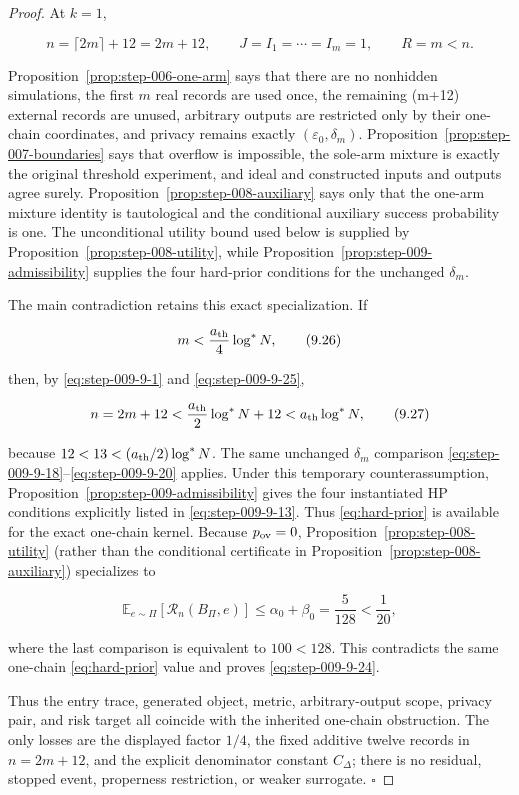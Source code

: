 \begin{proof}
At \(k=1\),

\[
n=\lceil2m\rceil+12=2m+12,
\qquad
J=I_1=\cdots=I_m=1,
\qquad
R=m<n.
\tag{9.25}\label{eq:step-009-9-25}
\]

Proposition~\ref{prop:step-006-one-arm} says that there are no
nonhidden simulations, the first \(m\) real records are used once, the
remaining (m+12) external records are unused, arbitrary outputs are
restricted only by their one-chain coordinates, and privacy remains
exactly \((\varepsilon_0,\delta_m)\).  
Proposition~\ref{prop:step-007-boundaries} says that overflow is
impossible, the sole-arm mixture is exactly the original threshold
experiment, and ideal and constructed inputs and outputs agree surely.
Proposition~\ref{prop:step-008-auxiliary} says only that the
one-arm mixture identity is tautological and the conditional auxiliary
success probability is one.  The unconditional utility bound used below
is supplied by Proposition~\ref{prop:step-008-utility}, while
Proposition~\ref{prop:step-009-admissibility} supplies the four hard-prior
conditions for the unchanged \(\delta_m\).

The main contradiction retains this exact specialization.  If

\[
m<\frac{a_{\rm th}}4\log^*N,
\tag{9.26}\label{eq:step-009-9-26}
\]

then, by \eqref{eq:step-009-9-1} and \eqref{eq:step-009-9-25},

\[
n=2m+12
<\frac{a_{\rm th}}2\log^*N+12
<a_{\rm th}\log^*N,
\tag{9.27}\label{eq:step-009-9-27}
\]

because \(12<13<(a_{\rm th}/2)\log^*N\).  The same unchanged
\(\delta_m\) comparison \eqref{eq:step-009-9-18}--\eqref{eq:step-009-9-20} applies.  Under this temporary
counterassumption, Proposition~\ref{prop:step-009-admissibility} gives
the four instantiated HP conditions explicitly listed in \eqref{eq:step-009-9-13}.  Thus
\eqref{eq:hard-prior} is
available for the exact one-chain kernel.  Because \(p_{\rm ov}=0\),
Proposition~\ref{prop:step-008-utility} (rather than the conditional
certificate in Proposition~\ref{prop:step-008-auxiliary}) specializes to

\[
\mathbb E_{e\sim\Pi}[\mathcal R_n(B_\Pi,e)]
\le\alpha_0+\beta_0
=\frac5{128}
<\frac1{20},
\tag{9.28}\label{eq:step-009-9-28}
\]

where the last comparison is equivalent to \(100<128\).  This
contradicts the same one-chain \eqref{eq:hard-prior} value and proves \eqref{eq:step-009-9-24}.

Thus the entry trace, generated object, metric, arbitrary-output scope,
privacy pair, and risk target all coincide with the inherited
one-chain obstruction.  The only losses are the displayed factor
\(1/4\), the fixed additive twelve records in \(n=2m+12\), and the
explicit denominator constant \(C_\Delta\); there is no residual,
stopped event, properness restriction, or weaker surrogate.  \(\square\)

\end{proof}

